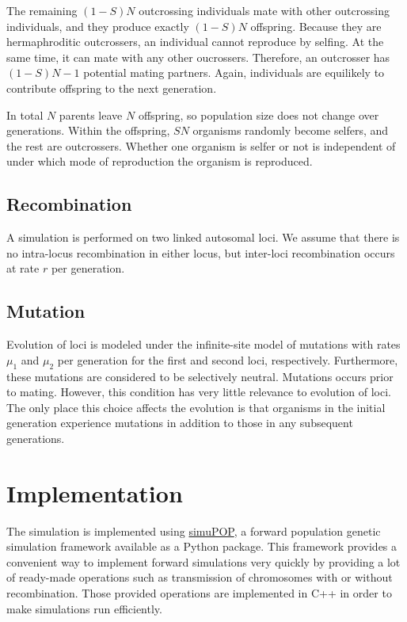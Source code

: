 \documentclass[12pt]{article}
\begin{document}
The remaining \((1 - S)N\) outcrossing individuals mate with other
outcrossing individuals, and they produce exactly \((1 - S)N\) offspring.
Because they are hermaphroditic outcrossers, an individual cannot
reproduce by selfing.
At the same time, it can mate with any other oucrossers.
Therefore, an outcrosser has \((1 - S) N - 1\) potential mating
partners.
Again, individuals are equilikely to contribute offspring to the next
generation.

In total \(N\) parents leave \(N\) offspring, so population size does
not change over generations.
Within the offspring, \(S N\) organisms randomly become selfers, and
the rest are outcrossers.
Whether one organism is selfer or not is independent of under which
mode of reproduction the organism is reproduced.


\subsection{Recombination}
\label{sec:recombination}

A simulation is performed on two linked autosomal loci.
We assume that there is no intra-locus recombination in either locus,
but inter-loci recombination occurs at rate \(r\) per generation.

\subsection{Mutation}
\label{sec:mutation}

Evolution of loci is modeled under the infinite-site model of
mutations with rates \(\mu_{1}\) and \(\mu_{2}\) per generation
for the first and second loci, respectively.
Furthermore, these mutations are considered to be selectively neutral.
Mutations occurs prior to mating.  However, this condition has
very little relevance to evolution of loci.
The only place this choice affects the evolution is that organisms in
the initial generation experience mutations in addition to those in
any subsequent generations.

\section{Implementation}
\label{sec:implementation}

The simulation is implemented using
\href{http://simupop.sourceforge.net/}{simuPOP}, a forward population
genetic simulation framework available as a Python package.
This framework provides a convenient way to implement forward
simulations very quickly by providing a lot of ready-made operations
such as transmission of chromosomes with or without recombination.
Those provided operations are implemented in C++ in order to make
simulations run efficiently.
\end{document}
